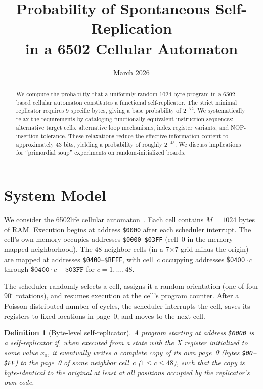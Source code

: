 \documentclass{article}
\title{Probability of Spontaneous Self-Replication\\in a 6502 Cellular Automaton}
\author{}
\date{March 2026}
\newcommand{\hex}[1]{\texttt{\$#1}}
\newtheorem{definition}{Definition}
\begin{document}
\maketitle

\begin{abstract}
We compute the probability that a uniformly random 1024-byte program in a
6502-based cellular automaton constitutes a functional self-replicator.
The strict minimal replicator requires 9 specific bytes, giving a base
probability of $2^{-72}$. We systematically relax the requirements by
cataloging functionally equivalent instruction sequences: alternative
target cells, alternative loop mechanisms, index register variants,
and NOP-insertion tolerance. These relaxations reduce the effective
information content to approximately 43 bits, yielding a probability
of roughly $2^{-43}$. We discuss implications for ``primordial soup''
experiments on random-initialized boards.
\end{abstract}

\tableofcontents

\section{System Model}
\label{sec:model}

We consider the 6502life cellular automaton~\cite{6502life}.
Each cell contains $M = 1024$ bytes of RAM.
Execution begins at address \hex{0000} after each scheduler interrupt.
The cell's own memory occupies addresses \hex{0000}--\hex{03FF}
(cell~0 in the memory-mapped neighborhood).
The 48 neighbor cells (in a 7$\times$7 grid minus the origin) are
mapped at addresses \hex{0400}--\hex{BFFF}, with cell~$c$ occupying
addresses $\hex{0400}\cdot c$ through $\hex{0400}\cdot c + \hex{03FF}$
for $c = 1, \ldots, 48$.

The scheduler randomly selects a cell, assigns it a random orientation
(one of four 90$^\circ$ rotations), and resumes execution at the cell's
program counter. After a Poisson-distributed number of cycles, the
scheduler interrupts the cell, saves its registers to fixed locations
in page~0, and moves to the next cell.

\begin{definition}[Byte-level self-replicator]
\label{def:replicator}
A program starting at address \hex{0000} is a \emph{self-replicator}
if, when executed from a state with the X register initialized to some
value $x_0$, it eventually writes a complete copy of its own page~0
(bytes \hex{00}--\hex{FF}) to the page~0 of some neighbor cell~$c$
($1 \le c \le 48$), such that the copy is byte-identical to the original
at least at all positions occupied by the replicator's own code.
\end{definition}
\end{document}
